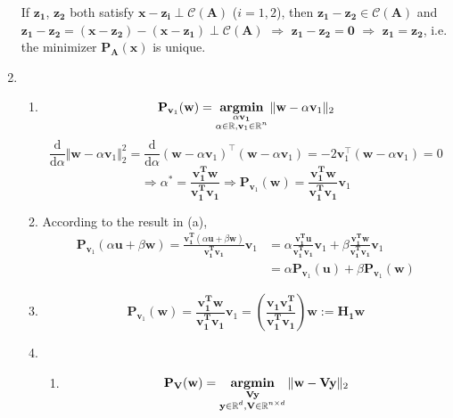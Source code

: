 \documentclass[11pt,letter,notitlepage]{article}
\DeclareMathOperator*{\argmin}{\bf argmin}
\newcommand{\proj}[2]{\textbf{P}_{#2} (#1)}
\theoremstyle{definition}
\begin{document}
\begin{solution}
\begin{enumerate}
	If $\mathbf{z_1}$, $\mathbf{z_2}$ both satisfy $\mathbf{x} - \mathbf{z_i} \perp \mathcal{C}(\mathbf{A})$ ($i = 1,2$), then $\mathbf{z_1} - \mathbf{z_2} \in \mathcal{C}(\mathbf{A})$ and $\mathbf{z_1} - \mathbf{z_2} = (\mathbf{x} - \mathbf{z_2}) - (\mathbf{x} - \mathbf{z_1}) \perp \mathcal{C}(\mathbf{A})$ $\Longrightarrow$ $\mathbf{z_1} - \mathbf{z_2} = \mathbf{0}$ $\Longrightarrow$ $\mathbf{z_1} = \mathbf{z_2}$, i.e. the minimizer $\proj{\mathbf{x}}{\mathbf{A}}$ is unique.
	\item 
	\begin{enumerate}
		\item 
		\[
		\proj{\mathbf{w}}{\mathbf{v}_1}
		=
		\argmin_{\substack{\alpha \mathbf{v_1} \\ \alpha \in \mathbb{R}, \mathbf{v}_1 \in \mathbb{R}^n}} \Vert \mathbf{w} - \alpha \mathbf{v}_1 \Vert_2
		\]
		\[
		\frac{\mathrm{d}}{\mathrm{d} \alpha} \Vert \mathbf{w} - \alpha \mathbf{v}_1 \Vert_2^2
		=
		\frac{\mathrm{d}}{\mathrm{d} \alpha} (\mathbf{w} - \alpha \mathbf{v}_1)^{\top}(\mathbf{w} - \alpha \mathbf{v}_1)
		=
		-2\mathbf{v}_1^{\top}(\mathbf{w} - \alpha \mathbf{v}_1)
		=
		0
		\]
		\[
		\Longrightarrow
		\alpha^*
		=
		\frac{\mathbf{v_1^T}\mathbf{w}}{\mathbf{v_1^T}\mathbf{v_1}}
		\Longrightarrow
		\proj{\mathbf{w}}{\mathbf{v}_1}
		=
		\frac{\mathbf{v_1^T}\mathbf{w}}{\mathbf{v_1^T}\mathbf{v_1}}\mathbf{v}_1
		\]
		\item 
		According to the result in (a),
		\begin{align*}
		\proj{\alpha \mathbf{u} + \beta \mathbf{w}}{\mathbf{v}_1}
		=
		\frac{\mathbf{v_1^T}(\alpha \mathbf{u} + \beta \mathbf{w})}{\mathbf{v_1^T}\mathbf{v_1}}\mathbf{v}_1
		&=
		\alpha \frac{\mathbf{v_1^T}\mathbf{u}}{\mathbf{v_1^T}\mathbf{v_1}}\mathbf{v}_1
		+
		\beta \frac{\mathbf{v_1^T}\mathbf{w}}{\mathbf{v_1^T}\mathbf{v_1}}\mathbf{v}_1\\
		&=
		\alpha \proj{\mathbf{u}}{\mathbf{v}_1} + \beta \proj{\mathbf{w}}{\mathbf{v}_1}
		\end{align*}
		\item 
		\[
		\proj{\mathbf{w}}{\mathbf{v}_1}
		=
		\frac{\mathbf{v_1^T}\mathbf{w}}{\mathbf{v_1^T}\mathbf{v_1}}\mathbf{v}_1
		=
		\left(\frac{\mathbf{v_1}\mathbf{v_1^T}}{\mathbf{v_1^T}\mathbf{v_1}}\right)\mathbf{w}
		:=
		\mathbf{H_1} \mathbf{w}
		\]
		\item 
		\begin{enumerate}
			\item 
			\[\proj{\mathbf{w}}{\mathbf{V}}
			=
			\argmin_{\substack{\mathbf{Vy} \\ \mathbf{y} \in \mathbb{R}^d, \mathbf{V} \in \mathbb{R}^{n \times d}}} \Vert \mathbf{w} - \mathbf{Vy} \Vert_2
\]
\end{enumerate}
\end{enumerate}
\end{enumerate}
\end{solution}
\end{document}

